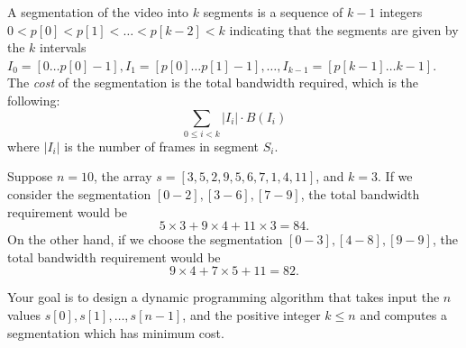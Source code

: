 \documentclass[11pt]{article}
\theoremstyle{definition}
\theoremstyle{theorem}
\begin{document}
A segmentation of the video into $k$ segments is a sequence of $k-1$
integers $0 < p[0] < p[1] < \ldots < p[k-2] < k$ indicating that the
segments are given by the $k$ intervals $I_0 = [0\ldots p[0]-1], I_1 =
[p[0] \ldots p[1]-1], \ldots, I_{k-1} = [p[k-1]\ldots k-1]$.  The {\em
	cost\/} of the segmentation is the total bandwidth required, which
is the following:
\[
\sum_{0 \le i < k} |I_i| \cdot B(I_i)
\]
where $|I_i|$ is the number of frames in segment $S_i$.

 Suppose $n = 10$, the array $s = [3, 5, 2, 9,
5, 6, 7, 1, 4, 11]$, and $k = 3$.  If we consider the segmentation
$[0-2], [3-6], [7-9]$, the total bandwidth requirement would be
\[
5 \times 3 + 9 \times 4 + 11 \times 3 = 84.
\]
On the other hand, if we choose the segmentation $[0-3], [4-8],
[9-9]$, the total bandwidth requirement would be
\[
9 \times 4 + 7 \times 5 + 11 = 82.
\]

Your goal is to design a dynamic programming algorithm that takes
input the $n$ values $s[0], s[1], \ldots, s[n-1]$, and the positive
integer $k \le n$ and computes a segmentation which has minimum cost.
\end{document}
